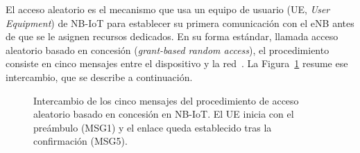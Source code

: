 El acceso aleatorio es el mecanismo que usa un equipo de usuario (UE, \textit{User Equipment})
de NB-IoT para establecer su primera comunicación con el eNB antes de que se le asignen
recursos dedicados. En su forma estándar, llamada acceso aleatorio basado en concesión
(\textit{grant-based random access}), el procedimiento consiste en cinco mensajes entre el
dispositivo y la red~\cite{ref6, ref4}. La Figura~\ref{fig:ra_msc} resume ese intercambio,
que se describe a continuación.

\begin{figure}[H]
\centering
{}
\caption{Intercambio de los cinco mensajes del procedimiento de acceso aleatorio basado en
concesión en NB-IoT. El UE inicia con el preámbulo (MSG1) y el enlace queda establecido tras
la confirmación (MSG5).}
\label{fig:ra_msc}
\end{figure}

